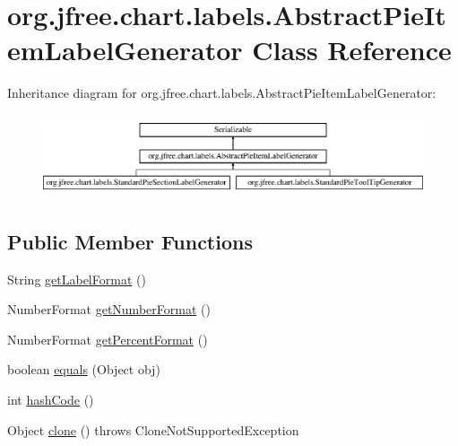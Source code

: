 \hypertarget{classorg_1_1jfree_1_1chart_1_1labels_1_1_abstract_pie_item_label_generator}{}\section{org.\+jfree.\+chart.\+labels.\+Abstract\+Pie\+Item\+Label\+Generator Class Reference}
\label{classorg_1_1jfree_1_1chart_1_1labels_1_1_abstract_pie_item_label_generator}
Inheritance diagram for org.\+jfree.\+chart.\+labels.\+Abstract\+Pie\+Item\+Label\+Generator\+:\begin{figure}[H]
\begin{center}
\leavevmode
\includegraphics[height=2.456140cm]{classorg_1_1jfree_1_1chart_1_1labels_1_1_abstract_pie_item_label_generator}
\end{center}
\end{figure}
\subsection*{Public Member Functions}
\begin{DoxyCompactItemize}
\item 
String \mbox{\hyperlink{classorg_1_1jfree_1_1chart_1_1labels_1_1_abstract_pie_item_label_generator_a0aeb620d6ae74c7a838d9906ce153465}{get\+Label\+Format}} ()
\item 
Number\+Format \mbox{\hyperlink{classorg_1_1jfree_1_1chart_1_1labels_1_1_abstract_pie_item_label_generator_a71d814e6b3ccdfd5f712b37e5ec7473d}{get\+Number\+Format}} ()
\item 
Number\+Format \mbox{\hyperlink{classorg_1_1jfree_1_1chart_1_1labels_1_1_abstract_pie_item_label_generator_ab13f8e781bb862f97253d945749107e9}{get\+Percent\+Format}} ()
\item 
boolean \mbox{\hyperlink{classorg_1_1jfree_1_1chart_1_1labels_1_1_abstract_pie_item_label_generator_a702da5f3b6681f1e9c9b86de6fefb458}{equals}} (Object obj)
\item 
int \mbox{\hyperlink{classorg_1_1jfree_1_1chart_1_1labels_1_1_abstract_pie_item_label_generator_ade858196c29fc2515d17c1f662931e2b}{hash\+Code}} ()
\item 
Object \mbox{\hyperlink{classorg_1_1jfree_1_1chart_1_1labels_1_1_abstract_pie_item_label_generator_ad4d0a15b079514de4002761fb637e679}{clone}} ()  throws Clone\+Not\+Supported\+Exception 
\end{DoxyCompactItemize}

